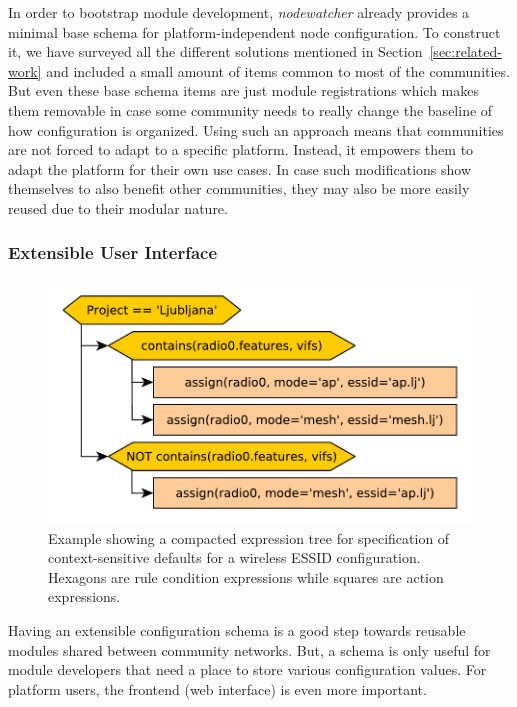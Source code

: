\documentclass[5p,sort&compress]{elsarticle}
\newcommand{\nodewatcher}{\textit{nodewatcher}}
\begin{document}
In order to bootstrap module development, \nodewatcher{} already provides a minimal base schema for platform-independent node configuration.
To construct it, we have surveyed all the different solutions mentioned in Section~\ref{sec:related-work} and included a small amount of items common to most of the communities.
But even these base schema items are just module registrations which makes them removable in case some community needs to really change the baseline of how configuration is organized.
Using such an approach means that communities are not forced to adapt to a specific platform.
Instead, it empowers them to adapt the platform for their own use cases.
In case such modifications show themselves to also benefit other communities, they may also be more easily reused due to their modular nature.

\subsubsection{Extensible User Interface}
\label{sec:form-generation}

\begin{figure}[t]
  \centering
  \includegraphics[scale=0.5]{figures/defaults-rules-tree.pdf}
  \caption{Example showing a compacted expression tree for specification of context-sensitive defaults for a wireless ESSID configuration. Hexagons are rule condition expressions while squares are action expressions.}
  \label{fig:defaults-rules-example}
\end{figure}

Having an extensible configuration schema is a good step towards reusable modules shared between community networks.
But, a schema is only useful for module developers that need a place to store various configuration values.
For platform users, the frontend (web interface) is even more important.
\end{document}
